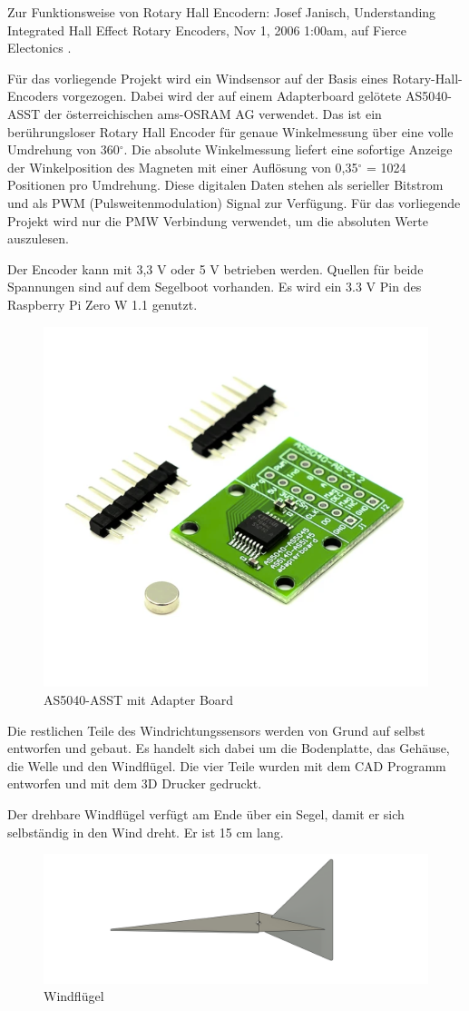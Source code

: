 Zur Funktionsweise von Rotary Hall Encodern: Josef Janisch, Understanding Integrated Hall Effect Rotary Encoders, Nov 1, 2006 1:00am, auf Fierce Electonics \cite{janisch_understanding_2006}.

Für das vorliegende Projekt wird ein Windsensor auf der Basis eines Rotary-Hall-Encoders vorgezogen. Dabei wird der auf einem Adapterboard gelötete AS5040-ASST der österreichischen ams-OSRAM AG verwendet. Das ist ein berührungsloser Rotary Hall Encoder für genaue Winkelmessung über eine volle Umdrehung von 360$^\circ$.  Die absolute Winkelmessung liefert eine sofortige Anzeige der Winkelposition des Magneten mit einer Auflösung von 0,35$^\circ$ = 1024 Positionen pro Umdrehung. Diese digitalen Daten stehen als serieller Bitstrom und als PWM (Pulsweitenmodulation) Signal zur Verfügung. Für das vorliegende Projekt wird nur die PMW Verbindung verwendet, um die absoluten Werte auszulesen.

Der Encoder kann mit 3,3 V oder 5 V betrieben werden. Quellen für beide Spannungen sind auf dem Segelboot vorhanden. Es wird ein 3.3 V Pin des Raspberry Pi Zero W 1.1 genutzt.

\begin{figure}
    \centering
    \includegraphics[width=0.5\linewidth]{assets/as5040image.png}
    \caption{AS5040-ASST mit Adapter Board}
    \label{fig:as5040}
\end{figure}
Die restlichen Teile des Windrichtungssensors werden von Grund auf selbst entworfen und gebaut. Es handelt sich dabei um die Bodenplatte, das Gehäuse, die Welle und den Windflügel. Die vier Teile wurden mit dem CAD Programm entworfen und mit dem 3D Drucker gedruckt.

Der drehbare Windflügel verfügt am Ende über ein Segel, damit er sich selbständig in den Wind dreht. Er ist 15 cm lang.
\begin{figure}[H]
    \centering
    \includegraphics[width=0.75\linewidth]{assets/windsensor_top.png}
    \caption{Windflügel}
    
\end{figure}

